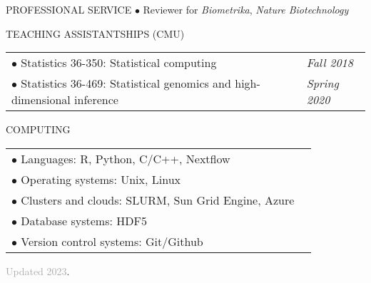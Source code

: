 \documentclass{resume} %
\begin{document}
\begin{rSection}{PROFESSIONAL SERVICE}
$\bullet$ Reviewer for \textit{Biometrika}, \textit{Nature Biotechnology}
\end{rSection}

\begin{rSection}{TEACHING ASSISTANTSHIPS (CMU)}
	\begin{tabular}{p{14cm}R{2.5cm}}
		$\bullet$ Statistics 36-350: Statistical computing 
		& \textit{Fall 2018} \\ 
		$\bullet$ Statistics 36-469: Statistical genomics and high-dimensional inference & \textit{Spring 2020}
	\end{tabular} 
\end{rSection}

\begin{rSection}{COMPUTING}
	
	\begin{tabular}{p{14cm}R{2.5cm}}
		$\bullet$ Languages:  R, Python, C/C++, Nextflow  &   \\ 
		$\bullet$ Operating systems: Unix, Linux & \\
		$\bullet$ Clusters and clouds: SLURM, Sun Grid Engine, Azure & \\
		$\bullet$ Database systems: HDF5 & \\
		$\bullet$ Version control systems: Git/Github
	\end{tabular} 
	
\end{rSection}

\textcolor{darkgray}{Updated 2023}.
\end{document}
